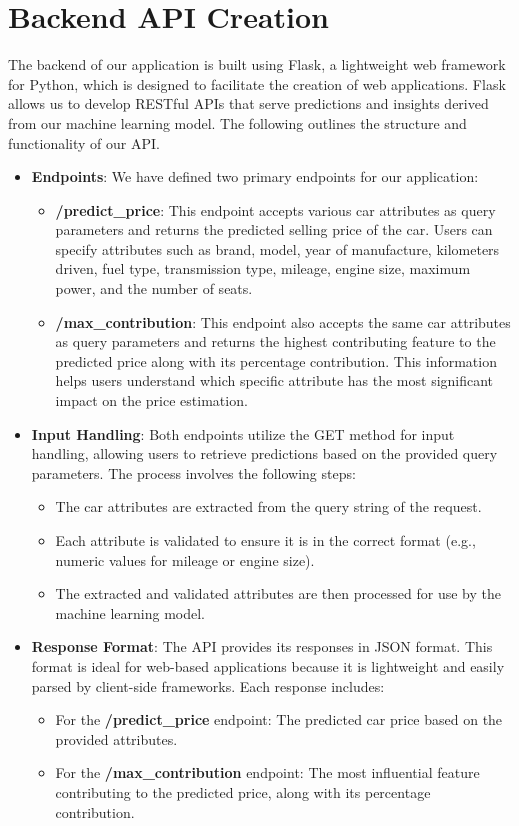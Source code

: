 \documentclass[a4paper,12pt]{article}
\begin{document}
\section{Backend API Creation}
\begin{justify}
	The backend of our application is built using Flask, a lightweight web framework for Python, which is designed to facilitate the creation of web applications. Flask allows us to develop RESTful APIs that serve predictions and insights derived from our machine learning model. The following outlines the structure and functionality of our API.
	
	\begin{itemize}
		\item \textbf{Endpoints}:
		We have defined two primary endpoints for our application:
		\begin{itemize}
			\item \textbf{/predict\_price}: This endpoint accepts various car attributes as query parameters and returns the predicted selling price of the car. Users can specify attributes such as brand, model, year of manufacture, kilometers driven, fuel type, transmission type, mileage, engine size, maximum power, and the number of seats.
			\item \textbf{/max\_contribution}: This endpoint also accepts the same car attributes as query parameters and returns the highest contributing feature to the predicted price along with its percentage contribution. This information helps users understand which specific attribute has the most significant impact on the price estimation.
		\end{itemize}
		
		\item \textbf{Input Handling}:
		Both endpoints utilize the GET method for input handling, allowing users to retrieve predictions based on the provided query parameters. The process involves the following steps:
		\begin{itemize}
			\item The car attributes are extracted from the query string of the request. 
			\item Each attribute is validated to ensure it is in the correct format (e.g., numeric values for mileage or engine size).
			\item The extracted and validated attributes are then processed for use by the machine learning model.
		\end{itemize}
		
		\item \textbf{Response Format}:
		The API provides its responses in JSON format. This format is ideal for web-based applications because it is lightweight and easily parsed by client-side frameworks. Each response includes:
		\begin{itemize}
			\item For the \textbf{/predict\_price} endpoint: The predicted car price based on the provided attributes.
			\item For the \textbf{/max\_contribution} endpoint: The most influential feature contributing to the predicted price, along with its percentage contribution.
		\end{itemize}
		

\end{itemize}
\end{justify}
\end{document}
